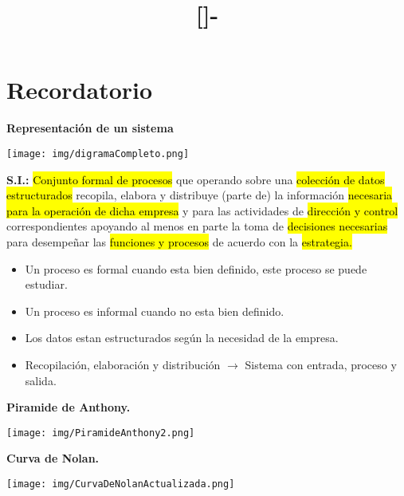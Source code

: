 \documentclass{templateNote}
\begin{document}

\title{[\asignatura]-\titulo}
\author{
    \autor
}
\portada
\margenes %
\section{Recordatorio}
\textbf{Representación de un sistema}
\begin{center}
    \texttt{[image: img/digramaCompleto.png]}
\end{center}
\noindent
\textbf{S.I.:} \hl{Conjunto formal de procesos} que operando sobre una \hl{colección de datos estructurados} recopila, elabora y distribuye (parte de) la información \hl{necesaria para la operación de dicha empresa} y para las actividades de \hl{dirección y control} correspondientes apoyando al menos en parte la toma de \hl{decisiones necesarias} para desempeñar las \hl{funciones y procesos} de acuerdo con la \hl{estrategia.}
\begin{itemize}
    \item Un proceso es formal cuando esta bien definido, este proceso se puede estudiar.
    \item Un proceso es informal cuando no esta bien definido.
    \item Los datos estan estructurados según la necesidad de la empresa.
    \item Recopilación, elaboración y distribución $\rightarrow$ Sistema con entrada, proceso y salida.
\end{itemize}

\newpage
\textbf{Piramide de Anthony.}
\begin{center}
    \texttt{[image: img/PiramideAnthony2.png]}
\end{center}

\textbf{Curva de Nolan.}
\begin{center}
    \texttt{[image: img/CurvaDeNolanActualizada.png]}
\end{center}
\end{document}
